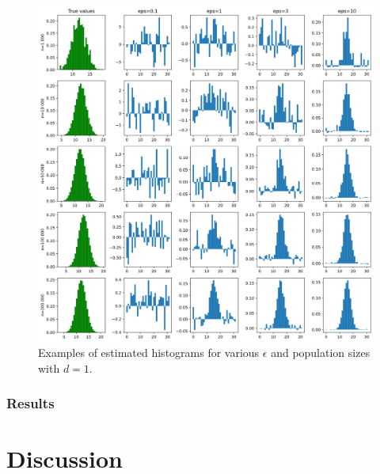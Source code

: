 \documentclass[12pt]{article}
\begin{document}
\begin{description}
    \begin{figure}
        \centering
        \includegraphics[width=\textwidth]{imgs/histogram_matrix.png}
        \caption{Examples of estimated histograms for various $\epsilon$ and population sizes with $d=1$.}
        \label{fig:histogram_matrix}
    \end{figure}
\end{description}

\subsubsection{Results}

\section{Discussion}

\end{document}
